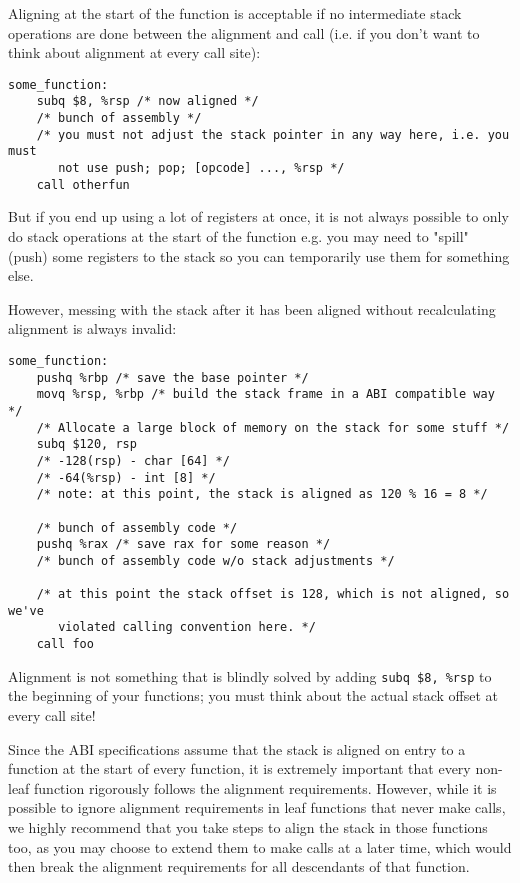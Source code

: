 \documentclass[11pt]{article}
\begin{document}
Aligning at the start of the function is acceptable if no intermediate stack operations
are done between the alignment and call (i.e. if you don't want to think about alignment
at every call site):

\begin{lstlisting}[caption={Proper alignment in function prelude}, captionpos=b]
some_function:
    subq $8, %rsp /* now aligned */
    /* bunch of assembly */
    /* you must not adjust the stack pointer in any way here, i.e. you must
       not use push; pop; [opcode] ..., %rsp */
    call otherfun
\end{lstlisting}

But if you end up using a lot of registers at once, it is not always possible to only do
stack operations at the start of the function e.g. you may need to "spill" (push) some
registers to the stack so you can temporarily use them for something else.

However, messing with the stack after it has been aligned without recalculating alignment
is always invalid:

\begin{lstlisting}[caption={Incorrect alignment}, captionpos=b]
some_function:
    pushq %rbp /* save the base pointer */
    movq %rsp, %rbp /* build the stack frame in a ABI compatible way */
    /* Allocate a large block of memory on the stack for some stuff */
    subq $120, rsp
    /* -128(rsp) - char [64] */
    /* -64(%rsp) - int [8] */
    /* note: at this point, the stack is aligned as 120 % 16 = 8 */

    /* bunch of assembly code */
    pushq %rax /* save rax for some reason */
    /* bunch of assembly code w/o stack adjustments */

    /* at this point the stack offset is 128, which is not aligned, so we've
       violated calling convention here. */
    call foo
\end{lstlisting}

Alignment is not something that is blindly solved by adding \texttt{subq \$8, \%rsp} to
the beginning of your functions; you must think about the actual stack offset at every
call site!

Since the ABI specifications assume that the stack is aligned on entry to a function at the
start of every function, it is extremely important that every non-leaf function rigorously
follows the alignment requirements. However, while it is possible to ignore alignment
requirements in leaf functions that never make calls, we highly recommend that you take
steps to align the stack in those functions too, as you may choose to extend them to make
calls at a later time, which would then break the alignment requirements for all
descendants of that function.
\end{document}
